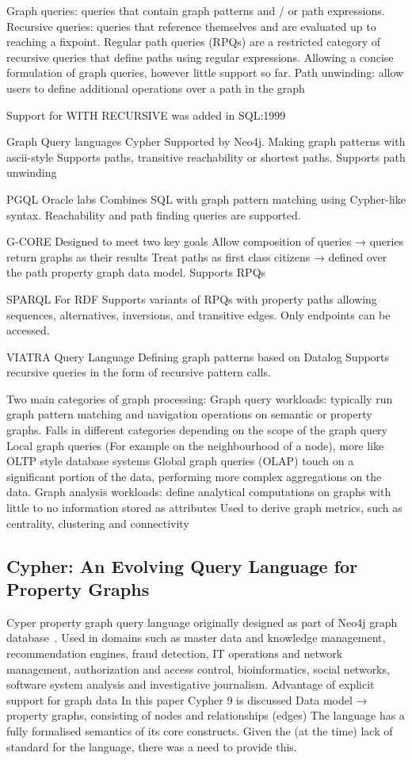 Graph queries: queries that contain graph patterns and / or path expressions. 
Recursive queries: queries that reference themselves and are evaluated up to reaching a fixpoint. 
Regular path queries (RPQs) are a restricted category of recursive queries that define paths using regular expressions. Allowing a concise formulation of graph queries, however little support so far. 
Path unwinding: allow users to define additional operations over a path in the graph

Support for WITH RECURSIVE was added in SQL:1999

Graph Query languages
Cypher
Supported by Neo4j. Making graph patterns with ascii-style 
Supports paths, transitive reachability or shortest paths. Supports path unwinding

PGQL 
Oracle labs
Combines SQL with graph pattern matching using Cypher-like syntax. 
Reachability and path finding queries are supported. 

G-CORE
Designed to meet two key goals 
Allow composition of queries → queries return graphs as their results
Treat paths as first class citizens → defined over the path property graph data model. 
Supports RPQs

SPARQL
For RDF 
Supports variants of RPQs with property paths allowing sequences, alternatives, inversions, and transitive edges. Only endpoints can be accessed. 

VIATRA Query Language
Defining graph patterns based on Datalog
Supports recursive queries in the form of recursive pattern calls. 


Two main categories of graph processing: 
Graph query workloads: typically run graph pattern matching and navigation operations on semantic or property graphs. Falls in different categories depending on the scope of the graph query
Local graph queries (For example on the neighbourhood of a node), more like OLTP style database systems
Global graph queries (OLAP) touch on a significant portion of the data, performing more complex aggregations on the data. 
Graph analysis workloads: define analytical computations on graphs with little to no information stored as attributes
Used to derive graph metrics, such as centrality, clustering and connectivity



\subsection{Cypher: An Evolving Query Language for Property Graphs}
Cyper property graph query language originally designed as part of Neo4j graph database~\cite{Francis2018}. 
Used in domains such as master data and knowledge management, recommendation engines, fraud detection, IT operations and network management, authorization and access control, bioinformatics, social networks, software system analysis and investigative journalism. 
Advantage of explicit support for graph data
In this paper Cypher 9 is discussed
Data model → property graphs, consisting of nodes and relationships (edges)
The language has a fully formalised semantics of its core constructs. Given the (at the time) lack of standard for the language, there was a need to provide this. 

